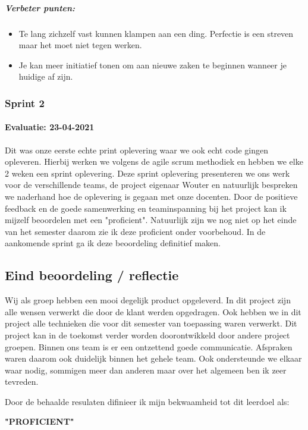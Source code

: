 	\subparagraph{Verbeter punten:}
	\begin{itemize}
		\setlength{\itemsep}{0pt}%
		\setlength{\parskip}{0pt}%
		\item Te lang zichzelf vast kunnen klampen aan een ding.
		Perfectie is een streven maar het moet niet tegen werken.
		\item Je kan meer initiatief tonen om aan nieuwe zaken te beginnen wanneer je huidige af zijn.
	\end{itemize}

	\bigskip

	\subsubsection{Sprint 2}
	\paragraph{Evaluatie: 23-04-2021}
	Dit was onze eerste echte print oplevering waar we ook echt code gingen opleveren.
	Hierbij werken we volgens de agile scrum methodiek en hebben we elke 2 weken een sprint oplevering.
	Deze sprint oplevering presenteren we ons werk voor de verschillende teams, de project eigenaar Wouter en
	natuurlijk bespreken we naderhand hoe de oplevering is gegaan met onze docenten.
	Door de positieve feedback en de goede samenwerking en teaminspanning bij het project kan ik mijzelf
	beoordelen met een "proficient".
	Natuurlijk zijn we nog niet op het einde van het semester daarom zie ik deze proficient onder voorbehoud.
	In de aankomende sprint ga ik deze beoordeling definitief maken.





\subsection{Eind beoordeling / reflectie}
Wij als groep hebben een mooi degelijk product opgeleverd.
In dit project zijn alle wensen verwerkt die door de klant werden opgedragen.
Ook hebben we in dit project alle technieken die voor dit semester van toepassing waren verwerkt.
Dit project kan in de toekomst verder worden doorontwikkeld door andere project groepen.
Binnen ons team is er een ontzettend goede communicatie. Afspraken waren daarom ook duidelijk binnen het gehele team.
Ook ondersteunde we elkaar waar nodig, sommigen meer dan anderen maar over het algemeen ben ik zeer tevreden.

Door de behaalde resulaten difinieer ik mijn bekwaamheid tot dit leerdoel als:\\
\par\vspace{10pt}\textbf{\uppercase{"Proficient"}}\\

\newpage
